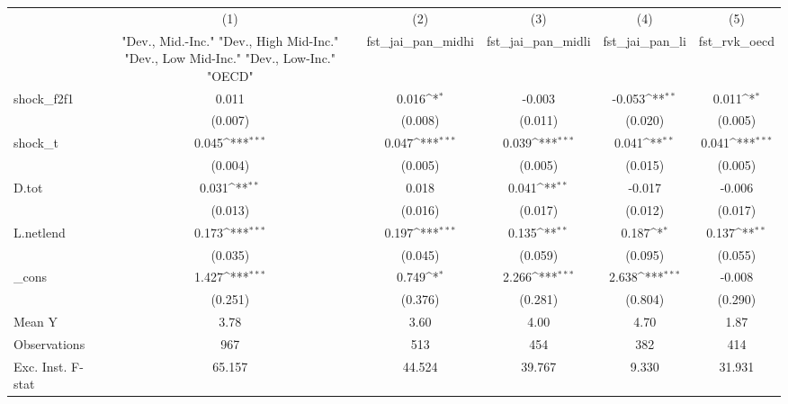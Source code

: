 {
\def\sym#1{\ifmmode^{#1}\else\(^{#1}\)\fi}
\begin{tabular}{l*{5}{c}}
\toprule
            &\multicolumn{1}{c}{(1)}&\multicolumn{1}{c}{(2)}&\multicolumn{1}{c}{(3)}&\multicolumn{1}{c}{(4)}&\multicolumn{1}{c}{(5)}\\
            &\multicolumn{1}{c}{ "Dev., Mid.-Inc." "Dev., High Mid-Inc." "Dev., Low Mid-Inc." "Dev., Low-Inc." "OECD" }&\multicolumn{1}{c}{fst\_jai\_pan\_midhi}&\multicolumn{1}{c}{fst\_jai\_pan\_midli}&\multicolumn{1}{c}{fst\_jai\_pan\_li}&\multicolumn{1}{c}{fst\_rvk\_oecd}\\
\midrule
shock\_f2f1  &       0.011         &       0.016\sym{*}  &      -0.003         &      -0.053\sym{**} &       0.011\sym{*}  \\
            &     (0.007)         &     (0.008)         &     (0.011)         &     (0.020)         &     (0.005)         \\
\addlinespace
shock\_t     &       0.045\sym{***}&       0.047\sym{***}&       0.039\sym{***}&       0.041\sym{**} &       0.041\sym{***}\\
            &     (0.004)         &     (0.005)         &     (0.005)         &     (0.015)         &     (0.005)         \\
\addlinespace
D.tot       &       0.031\sym{**} &       0.018         &       0.041\sym{**} &      -0.017         &      -0.006         \\
            &     (0.013)         &     (0.016)         &     (0.017)         &     (0.012)         &     (0.017)         \\
\addlinespace
L.netlend   &       0.173\sym{***}&       0.197\sym{***}&       0.135\sym{**} &       0.187\sym{*}  &       0.137\sym{**} \\
            &     (0.035)         &     (0.045)         &     (0.059)         &     (0.095)         &     (0.055)         \\
\addlinespace
\_cons      &       1.427\sym{***}&       0.749\sym{*}  &       2.266\sym{***}&       2.638\sym{***}&      -0.008         \\
            &     (0.251)         &     (0.376)         &     (0.281)         &     (0.804)         &     (0.290)         \\
\midrule
Mean Y      &        3.78         &        3.60         &        4.00         &        4.70         &        1.87         \\
Observations&         967         &         513         &         454         &         382         &         414         \\
Exc. Inst. F-stat&      65.157         &      44.524         &      39.767         &       9.330         &      31.931         \\
\bottomrule
\end{tabular}
}
